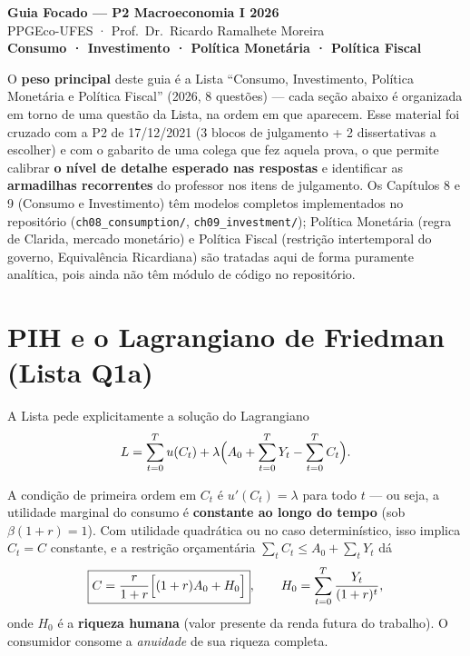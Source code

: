\documentclass[12pt, a4paper]{article}
\begin{document}
\begin{center}
  {\LARGE\bfseries\color{azul} Guia Focado --- P2 Macroeconomia I 2026}\\[0.4em]
  {\large\color{cinza} PPGEco-UFES · Prof.\ Dr.\ Ricardo Ramalhete Moreira}\\[0.3em]
  {\normalsize\color{laranja}\bfseries Consumo · Investimento · Política Monetária · Política Fiscal}
\end{center}

\vspace{0.3em}
\begin{provabox}[title={Metodologia: como este guia foi construído}]
O \textbf{peso principal} deste guia é a Lista ``Consumo, Investimento, Política
Monetária e Política Fiscal'' (2026, 8 questões) --- cada seção abaixo é
organizada em torno de uma questão da Lista, na ordem em que aparecem. Esse
material foi cruzado com a P2 de 17/12/2021 (3 blocos de julgamento + 2
dissertativas a escolher) e com o gabarito de uma colega que fez aquela prova,
o que permite calibrar \textbf{o nível de detalhe esperado nas respostas} e
identificar as \textbf{armadilhas recorrentes} do professor nos itens de
julgamento. Os Capítulos 8 e 9 (Consumo e Investimento) têm modelos completos
implementados no repositório (\texttt{ch08\_consumption/}, \texttt{ch09\_investment/});
Política Monetária (regra de Clarida, mercado monetário) e Política Fiscal
(restrição intertemporal do governo, Equivalência Ricardiana) são tratadas aqui
de forma puramente analítica, pois ainda não têm módulo de código no
repositório.
\end{provabox}

\tableofcontents
\newpage

\section{PIH e o Lagrangiano de Friedman (Lista Q1a)}

A Lista pede explicitamente a solução do Lagrangiano
\[
  L = \sum_{t=0}^{T} u(C_t) + \lambda\Bigl(A_0 + \sum_{t=0}^{T} Y_t - \sum_{t=0}^{T} C_t\Bigr).
\]

\begin{formulabox}[title={CPO e a anuidade da riqueza total}]
A condição de primeira ordem em $C_t$ é $u'(C_t) = \lambda$ para todo $t$ ---
ou seja, a utilidade marginal do consumo é \textbf{constante ao longo do
tempo} (sob $\beta(1+r)=1$). Com utilidade quadrática ou no caso
determinístico, isso implica $C_t = C$ constante, e a restrição orçamentária
$\sum_t C_t \le A_0+\sum_t Y_t$ dá
\[
  \boxed{C = \frac{r}{1+r}\Bigl[(1+r)A_0 + H_0\Bigr]}, \qquad
  H_0 = \sum_{t=0}^{T} \frac{Y_t}{(1+r)^t},
\]
onde $H_0$ é a \textbf{riqueza humana} (valor presente da renda futura do
trabalho). O consumidor consome a \emph{anuidade} de sua riqueza completa.
\end{formulabox}
\end{document}
